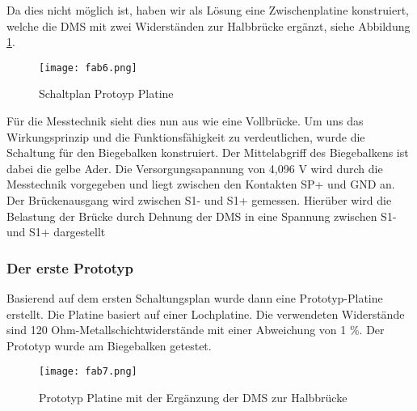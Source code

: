 Da dies nicht möglich ist, haben wir als Lösung eine Zwischenplatine konstruiert, welche die DMS mit zwei Widerständen zur Halbbrücke ergänzt, siehe Abbildung \ref{fig:fab6}.

\begin{figure}[h]
    \begin{center}
        \texttt{[image: fab6.png]}
        \caption[Schaltplan Protoyp Platine (Abbildungsverzeichnis)]{Schaltplan Protoyp Platine}
        
        \label{fig:fab6}
    \end{center}
\end{figure}

Für die Messtechnik sieht dies nun aus wie eine Vollbrücke. Um uns das Wirkungsprinzip und die Funktionsfähigkeit zu verdeutlichen, wurde die Schaltung für den Biegebalken konstruiert.
Der Mittelabgriff des Biegebalkens ist dabei die gelbe Ader. Die Versorgungsapannung von 4,096 V wird durch die Messtechnik vorgegeben und liegt zwischen den Kontakten SP+ und GND an. Der Brückenausgang wird zwischen S1- und S1+ gemessen. Hierüber wird die Belastung der Brücke durch Dehnung der DMS in eine Spannung zwischen S1- und S1+ dargestellt
\subsubsection{Der erste Prototyp}
Basierend auf dem ersten Schaltungsplan wurde dann eine Prototyp-Platine erstellt. Die Platine basiert auf einer Lochplatine. Die verwendeten Widerstände sind 120 Ohm-Metallschichtwiderstände mit einer Abweichung von 1 \%. Der Prototyp wurde am Biegebalken getestet.
\begin{figure}[h]
    \begin{center}
        \texttt{[image: fab7.png]}
        \caption[Prototyp Platine mit der Ergänzung der DMS zur Halbbrücke (Abbildungsverzeichnis)]{Prototyp Platine mit der Ergänzung der DMS zur Halbbrücke}
        
        \label{fig:fab7}
    \end{center}
\end{figure}

